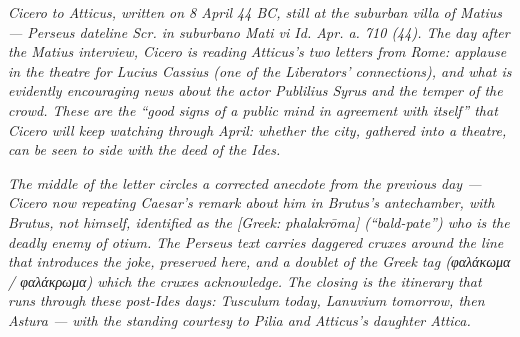 
\textit{Cicero to Atticus, written on 8 April 44 BC, still at the
suburban villa of Matius --- Perseus dateline \textit{Scr. in
suburbano Mati vi Id. Apr. a. 710 (44)}. The day after the
Matius interview, Cicero is reading Atticus's two letters from
Rome: applause in the theatre for Lucius Cassius (one of the
Liberators' connections), and what is evidently encouraging
news about the actor Publilius Syrus and the temper of the
crowd. These are the ``good signs of a public mind in agreement
with itself'' that Cicero will keep watching through April:
whether the city, gathered into a theatre, can be seen to side
with the deed of the Ides.}

\textit{The middle of the letter circles a corrected anecdote
from the previous day --- Cicero now repeating Caesar's remark
about him in Brutus's antechamber, with Brutus, not himself,
identified as the \textit{[Greek: phalakrōma]} (``bald-pate'')
who is the deadly enemy of \textit{otium}. The Perseus text
carries daggered cruxes around the line that introduces the
joke, preserved here, and a doublet of the Greek tag
(\textit{φαλάκωμα} / \textit{φαλάκρωμα}) which the cruxes
acknowledge. The closing is the itinerary that runs through
these post-Ides days: Tusculum today, Lanuvium tomorrow, then
Astura --- with the standing courtesy to Pilia and Atticus's
daughter Attica.}
